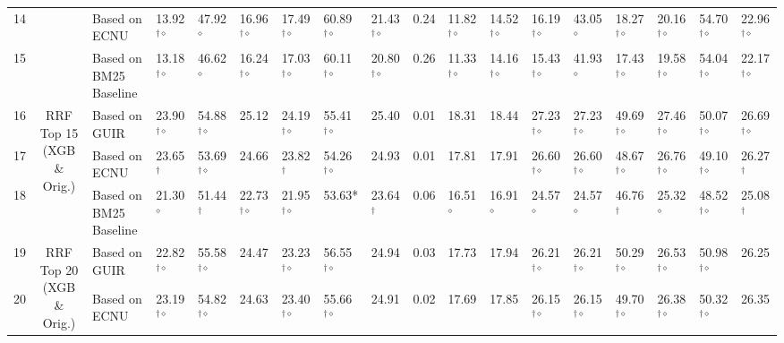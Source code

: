 \begin{table*}
{\begin{tabular}{ccllllllllllllllll}
14  &  & Based on ECNU  & 13.92$^{\dagger\diamond}$ & 47.92 $^{\diamond}$  & 16.96$^{\dagger\diamond}$ & 17.49$^{\dagger\diamond}$ & 60.89$^{\dagger\diamond}$ & 21.43$^{\dagger\diamond}$ & 0.24 & 11.82$^{\dagger\diamond}$ & 14.52$^{\dagger\diamond}$ & 16.19$^{\dagger\diamond}$ & 43.05$^{\diamond}$ & 18.27$^{\dagger\diamond}$ & 20.16$^{\dagger\diamond}$ & 54.70$^{\dagger\diamond}$ & 22.96$^{\dagger\diamond}$\tabularnewline
15  &  & Based on BM25 Baseline  & 13.18$^{\dagger\diamond}$ & 46.62 $^{\diamond}$  & 16.24$^{\dagger\diamond}$ & 17.03$^{\dagger\diamond}$ & 60.11$^{\dagger\diamond}$ & 20.80$^{\dagger\diamond}$ & 0.26 & 11.33$^{\dagger\diamond}$ & 14.16$^{\dagger\diamond}$ & 15.43$^{\dagger\diamond}$ & 41.93$^{\diamond}$  & 17.43$^{\dagger\diamond}$ & 19.58$^{\dagger\diamond}$ & 54.04$^{\dagger\diamond}$ & 22.17$^{\dagger\diamond}$\tabularnewline
\midrule 
16 & \multirow{3}{*}{RRF Top 15 (XGB \& Orig.)} & Based on GUIR  & 23.90$^{\dagger\diamond}$ & 54.88$^{\dagger\diamond}$ & 25.12  & 24.19$^{\dagger\diamond}$ & 55.41$^{\dagger\diamond}$ & 25.40 & 0.01 & 18.31  & 18.44 & 27.23$^{\dagger\diamond}$ & 27.23$^{\dagger\diamond}$ & 49.69$^{\dagger\diamond}$ & 27.46$^{\dagger\diamond}$ & 50.07$^{\dagger\diamond}$ & 26.69$^{\dagger\diamond}$\tabularnewline
17  &  & Based on ECNU  & 23.65$^{\dagger}$  & 53.69$^{\dagger\diamond}$ & 24.66  & 23.82$^{\dagger}$  & 54.26$^{\dagger\diamond}$ & 24.93 & 0.01 & 17.81  & 17.91 & 26.60$^{\dagger\diamond}$ & 26.60$^{\dagger\diamond}$ & 48.67$^{\dagger\diamond}$ & 26.76$^{\dagger\diamond}$ & 49.10$^{\dagger\diamond}$ & 26.27$^{\dagger}$ \tabularnewline
18  &  & Based on BM25 Baseline  & 21.30 $^{\diamond}$  & 51.44$^{\dagger}$  & 22.73$^{\dagger\diamond}$ & 21.95$^{\dagger\diamond}$ & 53.63{*} & 23.64$^{\dagger}$  & 0.06 & 16.51$^{\diamond}$  & 16.91$^{\diamond}$  & 24.57$^{\diamond}$  & 24.57$^{\diamond}$   & 46.76$^{\dagger}$  & 25.32$^{\diamond}$  & 48.52$^{\dagger\diamond}$ & 25.08$^{\dagger}$ \tabularnewline
\midrule 
19 & \multirow{3}{*}{RRF Top 20 (XGB \& Orig.)} & Based on GUIR  & 22.82$^{\dagger\diamond}$ & 55.58$^{\dagger\diamond}$ & 24.47  & 23.23$^{\dagger\diamond}$ & 56.55$^{\dagger\diamond}$ & 24.94 & 0.03 & 17.73  & 17.94 & 26.21$^{\dagger\diamond}$ & 26.21$^{\dagger\diamond}$ & 50.29$^{\dagger\diamond}$ & 26.53$^{\dagger\diamond}$ & 50.98$^{\dagger\diamond}$ & 26.25\tabularnewline
20  &  & Based on ECNU  & 23.19$^{\dagger\diamond}$ & 54.82$^{\dagger\diamond}$ & 24.63  & 23.40$^{\dagger\diamond}$ & 55.66$^{\dagger\diamond}$ & 24.91 & 0.02 & 17.69  & 17.85 & 26.15$^{\dagger\diamond}$ & 26.15$^{\dagger\diamond}$ & 49.70$^{\dagger\diamond}$ & 26.38$^{\dagger\diamond}$ & 50.32$^{\dagger\diamond}$ & 26.35\tabularnewline

\end{tabular}}
\end{table*}
